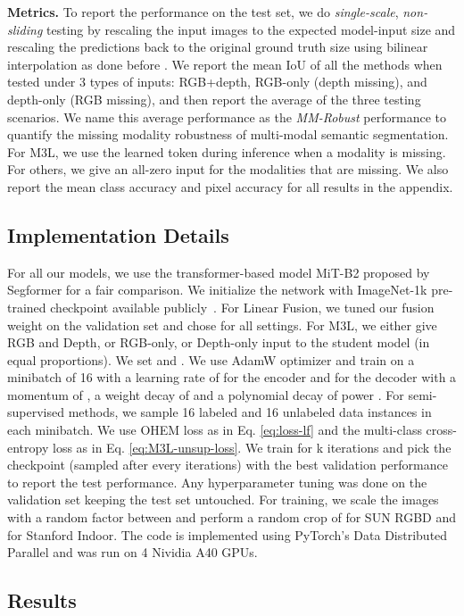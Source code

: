 \documentclass[10pt,twocolumn,letterpaper]{article}
\begin{document}
\noindent\textbf{Metrics.} To report the performance on the test set, we do \emph{single-scale}, \emph{non-sliding} testing by rescaling the input images to the expected model-input size and rescaling the predictions back to the original ground truth size using bilinear interpolation as done before \cite{chen2021-CPS, u2pl}. 
We report the mean IoU of all the methods when tested under 3 types of inputs: RGB+depth, RGB-only (depth missing), and depth-only (RGB missing), and then report the average of the three testing scenarios. We name this average performance as the \textit{MM-Robust} performance to quantify the missing modality robustness of multi-modal semantic segmentation. For M3L, we use the learned token during inference when a modality is missing.  For others, we give an all-zero input for the modalities that are missing. We also report the mean class accuracy and pixel accuracy for all results in the appendix.

\subsection{Implementation Details}
For all our models, we use the transformer-based model MiT-B2 proposed by Segformer \cite{segformer} for a fair comparison. We initialize the network with ImageNet-1k pre-trained checkpoint available publicly~\cite{segformer}.
For Linear Fusion, we tuned our fusion weight on the validation set and chose  for all settings. 
For M3L, we either give RGB and Depth, or RGB-only, or Depth-only input to the student model (in equal proportions). We set  and . 
We use AdamW optimizer \cite{adamw} and train on a minibatch of 16 with a learning rate of  for the encoder and  for the decoder with a momentum of , a weight decay of  and a polynomial decay of power . 
For semi-supervised methods, we sample 16 labeled and 16 unlabeled data instances in each minibatch.
We use OHEM loss \cite{ohem} as  in Eq. \ref{eq:loss-lf} and the multi-class cross-entropy loss as  in Eq. \ref{eq:M3L-unsup-loss}. We train for k
iterations and pick the checkpoint (sampled after every  iterations) with the best validation performance to report the test performance. Any hyperparameter tuning was done on the validation set keeping the test set untouched.
For training, we scale the images with a random factor between  and perform a random crop of  for SUN RGBD and  for Stanford Indoor. 
The code is implemented using PyTorch's Data Distributed Parallel and was run on 4 Nividia A40 GPUs. 

\subsection{Results}
\end{document}
